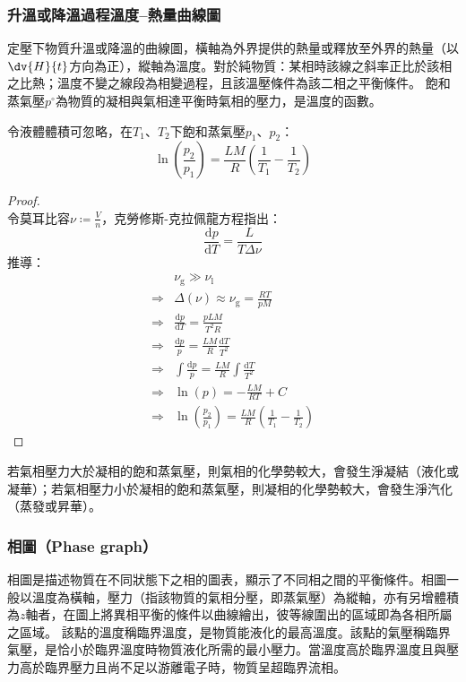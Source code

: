 \documentclass[a4paper,12pt]{report}
\begin{document}
\subsubsection{升溫或降溫過程溫度–熱量曲線圖}
定壓下物質升溫或降溫的曲線圖，橫軸為外界提供的熱量或釋放至外界的熱量（以$\dv{H}{t}$方向為正），縱軸為溫度。對於純物質：某相時該線之斜率正比於該相之比熱；溫度不變之線段為相變過程，且該溫壓條件為該二相之平衡條件。
飽和蒸氣壓$p^\circ$為物質的凝相與氣相達平衡時氣相的壓力，是溫度的函數。

令液體體積可忽略，在$T_1$、$T_2$下飽和蒸氣壓$p_1$、$p_2$：
\[\ln\left(\frac{p_2}{p_1}\right)=\frac{LM}{R}\left(\frac{1}{T_1}-\frac{1}{T_2}\right)\]
\begin{proof}\mbox{}\\
令莫耳比容$\nu\coloneq\frac{V}{n}$，克勞修斯-克拉佩龍方程指出：
\[\frac{\mathrm{d}p}{\mathrm{d}T}=\frac{L}{T \Delta \nu}\]
推導：
\[\begin{aligned}
&\nu_{\text{g}}\gg\nu_{\text{l}}\\
\Rightarrow &\Delta \left(\nu\right)\approx \nu_{\text{g}}=\frac{RT}{pM}\\
\Rightarrow &\frac{\mathrm{d}p}{\mathrm{d}T}=\frac{pLM}{T^2 R}\\
\Rightarrow &\frac{\mathrm{d}p}{p}=\frac{LM}{R}\frac{\mathrm{d}T}{T^2}\\
\Rightarrow &\int\frac{\mathrm{d}p}{p}=\frac{LM}{R}\int\frac{\mathrm{d}T}{T^2}\\
\Rightarrow &\ln(p)=-\frac{LM}{RT}+C\\
\Rightarrow &\ln\left(\frac{p_2}{p_1}\right)=\frac{LM}{R}\left(\frac{1}{T_1}-\frac{1}{T_2}\right)
\end{aligned}\]
\end{proof}

若氣相壓力大於凝相的飽和蒸氣壓，則氣相的化學勢較大，會發生淨凝結（液化或凝華）；若氣相壓力小於凝相的飽和蒸氣壓，則凝相的化學勢較大，會發生淨汽化（蒸發或昇華）。
\subsubsection{相圖（Phase graph）}
相圖是描述物質在不同狀態下之相的圖表，顯示了不同相之間的平衡條件。相圖一般以溫度為橫軸，壓力（指該物質的氣相分壓，即蒸氣壓）為縱軸，亦有另增體積為$z$軸者，在圖上將異相平衡的條件以曲線繪出，彼等線圍出的區域即為各相所屬之區域。
\bct\bfH\ctr{}\ef\FB\ect
{}
該點的溫度稱臨界溫度，是物質能液化的最高溫度。該點的氣壓稱臨界氣壓，是恰小於臨界溫度時物質液化所需的最小壓力。當溫度高於臨界溫度且與壓力高於臨界壓力且尚不足以游離電子時，物質呈超臨界流相。
\end{document}
